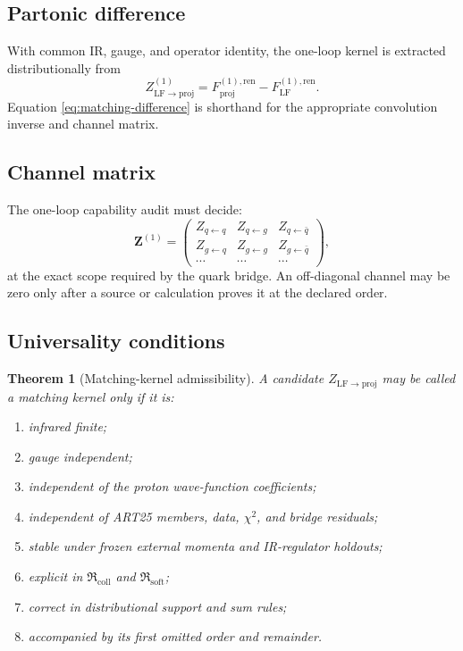 \documentclass[11pt]{article}
\newtheorem{theorem}[definition]{Theorem}
\newcommand{\Coll}{\ensuremath{\mathrm{coll}}}
\newcommand{\Soft}{\ensuremath{\mathrm{soft}}}
\newcommand{\Proj}{\ensuremath{\mathrm{proj}}}
\newcommand{\Ren}{\ensuremath{\mathrm{ren}}}
\begin{document}
\subsection{Partonic difference}

With common IR, gauge, and operator identity, the one-loop kernel is extracted distributionally from
\begin{equation}
 Z_{\mathrm{LF}\to\Proj}^{(1)}
 =
 F_{\Proj}^{(1),\Ren}
 -
 F_{\mathrm{LF}}^{(1),\Ren}.
 \label{eq:matching-difference}
\end{equation}
Equation \eqref{eq:matching-difference} is shorthand for the appropriate convolution inverse and channel matrix.

\subsection{Channel matrix}

The one-loop capability audit must decide:
\begin{equation}
 \bm Z^{(1)}
 =
 \begin{pmatrix}
 Z_{q\leftarrow q} & Z_{q\leftarrow g} & Z_{q\leftarrow\bar q}\\
 Z_{g\leftarrow q} & Z_{g\leftarrow g} & Z_{g\leftarrow\bar q}\\
 \cdots & \cdots & \cdots
 \end{pmatrix},
 \label{eq:channel-matrix}
\end{equation}
at the exact scope required by the quark bridge.  An off-diagonal channel may be zero only after a source or calculation proves it at the declared order.

\subsection{Universality conditions}

\begin{theorem}[Matching-kernel admissibility]
\label{thm:matching-admissibility}
A candidate \(Z_{\mathrm{LF}\to\Proj}\) may be called a matching kernel only if it is:
\begin{enumerate}
\item infrared finite;
\item gauge independent;
\item independent of the proton wave-function coefficients;
\item independent of ART25 members, data, \(\chi^2\), and bridge residuals;
\item stable under frozen external momenta and IR-regulator holdouts;
\item explicit in \(\mathfrak R_{\Coll}\) and \(\mathfrak R_{\Soft}\);
\item correct in distributional support and sum rules;
\item accompanied by its first omitted order and remainder.
\end{enumerate}
\end{theorem}
\end{document}

